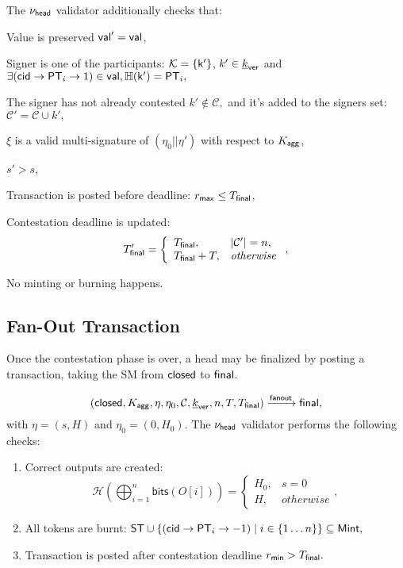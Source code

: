 \noindent The $\nu_\mathsf{head}$ validator additionally checks that:
\begin{menumerate}
  \item Value is preserved $\mathsf{val}' = \mathsf{val}$,
  \item Signer is one of the participants: $\mathcal K = \{\mathsf{k'}\}$, $k' \in \underline{k}_{\mathsf{ver}}$ and
    $
    \exists (\mathsf{cid} \rightarrow \mathsf{PT}_i \rightarrow 1) \in \mathsf{val}, \mathbb{H}(\mathsf{k'}) = \mathsf{PT}_i,
    $
  \item The signer has not already contested $k' \not\in \mathcal{C},$  and it's added to the signers set: $\mathcal{C}' = \mathcal{C} \cup k',$
  \item $\xi$ is a valid multi-signature of $(\eta_0 || \eta')$ with respect to $K_{\mathsf{agg}}$, 
  \item $s' > s$, 
  \item Transaction is posted before deadline: $r_{\mathsf{max}} \leq T_{\mathsf{final}}$,
  \item Contestation deadline is updated:
     $$
     T_{\mathsf{final}}' = 
        \left\{\begin{array}{ll}
             T_{\mathsf{final}},     &  |\mathcal{C}'| = n, \\
             T_{\mathsf{final}} + T, &  \mathit{otherwise} \\
        \end{array}\right.,
     $$
  \item No minting or burning happens.
\end{menumerate}


\subsection{Fan-Out Transaction}  



Once the contestation phase is over, a head
may be finalized by posting a \mtxFanout{} transaction, taking the SM
from $\mathsf{closed}$ to $\mathsf{final}$.  

$$
   (\mathsf{closed},K_{\mathsf{agg}},\eta,\eta_0,\mathcal{C},\underline{k}_{\mathsf{ver}},n,T,T_{\mathsf{final}}) \xrightarrow{\mathsf{fanout}} \mathsf{final},
$$
with $\eta = (s, H)$ and $\eta_0 = (0, H_0).$
The $\nu_\mathsf{head}$ validator performs the following checks:
\begin{enumerate}
  \item Correct outputs are created: 
  $$
  \mathcal{H}(\bigoplus_{i=1}^n \mathsf{bits}(O[i])) = 
    \left\{
    \begin{array}{ll}
        H_0, & s = 0 \\
        H, &\mathit{otherwise}
    \end{array}
    \right.,
  $$
  \item All tokens are burnt: 
     $\mathsf{ST} \cup \{(\mathsf{cid} \rightarrow \mathsf{PT}_i \rightarrow -1) \mid i \in \{1\dots n\}\} \subseteq \mathsf{Mint},$
  \item Transaction is posted after contestation deadline $r_{\mathsf{min}} > T_{\mathsf{final}}.$
\end{enumerate}

